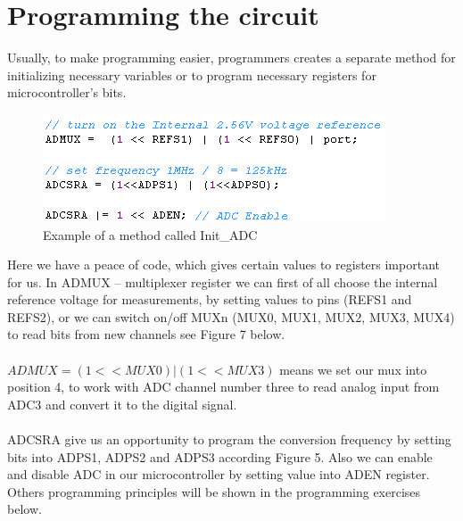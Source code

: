 \documentclass[english]{article}
\begin{document}
\section{Programming the circuit}
Usually, to make programming easier, programmers creates a separate method for initializing necessary variables or to program necessary registers for microcontroller’s bits.
\begin{figure}[H]
\centerline{\includegraphics[scale=0.8]{MicroLab8/7}}
\caption{Example of a method called Init\_ADC}
\end{figure}
Here we have a peace of code, which gives certain values to registers important for us. In ADMUX – multiplexer register we can first of all choose the internal reference voltage for measurements, by setting values to pins (REFS1 and REFS2), or we can switch on/off MUXn (MUX0, MUX1,  MUX2, MUX3, MUX4) to read bits from new channels see Figure 7 below. \\\\
$ADMUX = (1<<MUX0) | (1<<MUX3)$ means we set our mux into position 4, to work with ADC channel number three to read analog input from ADC3 and convert it to the digital signal.\\\\
ADCSRA give us an opportunity to program the conversion frequency by setting bits into ADPS1, ADPS2 and ADPS3 according Figure 5. Also we can enable and disable ADC in our microcontroller by setting value into ADEN register. Others programming principles will be shown in the programming exercises below.
\end{document}
